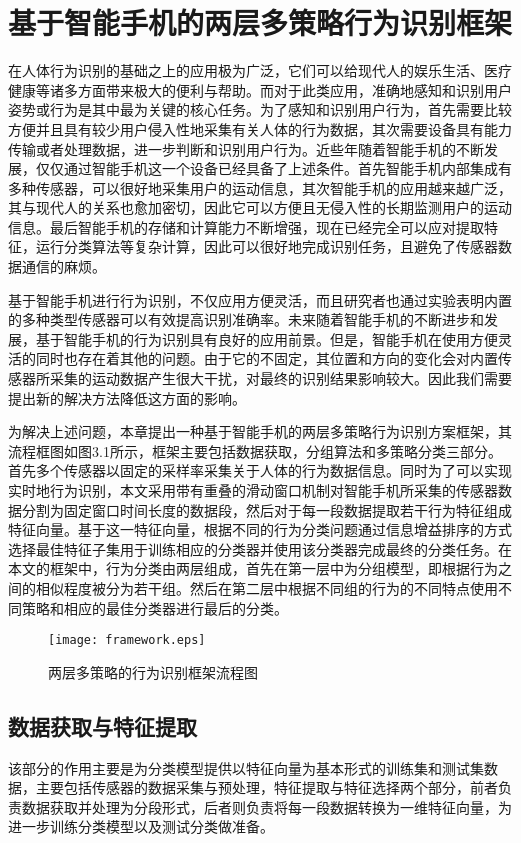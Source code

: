 \chapter{基于智能手机的两层多策略行为识别框架}

\par 在人体行为识别的基础之上的应用极为广泛，它们可以给现代人的娱乐生活、医疗健康等诸多方面带来极大的便利与帮助。而对于此类应用，准确地感知和识别用户姿势或行为是其中最为关键的核心任务。为了感知和识别用户行为，首先需要比较方便并且具有较少用户侵入性地采集有关人体的行为数据，其次需要设备具有能力传输或者处理数据，进一步判断和识别用户行为。近些年随着智能手机的不断发展，仅仅通过智能手机这一个设备已经具备了上述条件。首先智能手机内部集成有多种传感器，可以很好地采集用户的运动信息，其次智能手机的应用越来越广泛，其与现代人的关系也愈加密切，因此它可以方便且无侵入性的长期监测用户的运动信息。最后智能手机的存储和计算能力不断增强，现在已经完全可以应对提取特征，运行分类算法等复杂计算，因此可以很好地完成识别任务，且避免了传感器数据通信的麻烦。
\par 基于智能手机进行行为识别，不仅应用方便灵活，而且研究者也通过实验表明内置的多种类型传感器可以有效提高识别准确率。未来随着智能手机的不断进步和发展，基于智能手机的行为识别具有良好的应用前景。但是，智能手机在使用方便灵活的同时也存在着其他的问题。由于它的不固定，其位置和方向的变化会对内置传感器所采集的运动数据产生很大干扰，对最终的识别结果影响较大。因此我们需要提出新的解决方法降低这方面的影响。
\par 为解决上述问题，本章提出一种基于智能手机的两层多策略行为识别方案框架，其流程框图如图3.1所示，框架主要包括数据获取，分组算法和多策略分类三部分。首先多个传感器以固定的采样率采集关于人体的行为数据信息。同时为了可以实现实时地行为识别，本文采用带有重叠的滑动窗口机制对智能手机所采集的传感器数据分割为固定窗口时间长度的数据段，然后对于每一段数据提取若干行为特征组成特征向量。基于这一特征向量，根据不同的行为分类问题通过信息增益排序的方式选择最佳特征子集用于训练相应的分类器并使用该分类器完成最终的分类任务。在本文的框架中，行为分类由两层组成，首先在第一层中为分组模型，即根据行为之间的相似程度被分为若干组。然后在第二层中根据不同组的行为的不同特点使用不同策略和相应的最佳分类器进行最后的分类。
\begin{figure}[ht]
\centering
\texttt{[image: framework.eps]}
\caption{两层多策略的行为识别框架流程图}
\end{figure}

\section{数据获取与特征提取}
\par 该部分的作用主要是为分类模型提供以特征向量为基本形式的训练集和测试集数据，主要包括传感器的数据采集与预处理，特征提取与特征选择两个部分，前者负责数据获取并处理为分段形式，后者则负责将每一段数据转换为一维特征向量，为进一步训练分类模型以及测试分类做准备。
